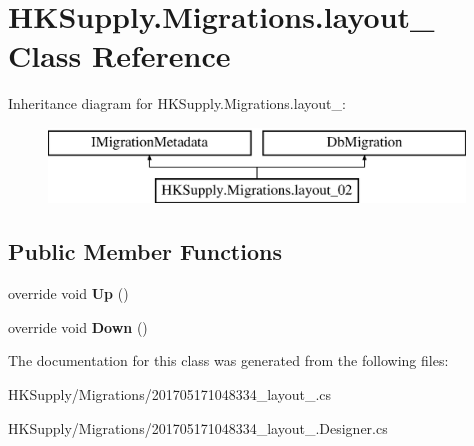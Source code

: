 \hypertarget{class_h_k_supply_1_1_migrations_1_1layout__02}{}\section{H\+K\+Supply.\+Migrations.\+layout\+\_ Class Reference}
\label{class_h_k_supply_1_1_migrations_1_1layout__02}
Inheritance diagram for H\+K\+Supply.\+Migrations.\+layout\+\_\+:\begin{figure}[H]
\begin{center}
\leavevmode
\includegraphics[height=2.000000cm]{class_h_k_supply_1_1_migrations_1_1layout__02}
\end{center}
\end{figure}
\subsection*{Public Member Functions}
\begin{DoxyCompactItemize}
\item 
\mbox{\label{class_h_k_supply_1_1_migrations_1_1layout__02_accb8fae63b4e422a6ebfacbe2803ad17}} 
override void {\bfseries Up} ()
\item 
\mbox{\label{class_h_k_supply_1_1_migrations_1_1layout__02_a813c7ef5aafacbc2a55a895b55b9f4bd}} 
override void {\bfseries Down} ()
\end{DoxyCompactItemize}


The documentation for this class was generated from the following files\+:\begin{DoxyCompactItemize}
\item 
H\+K\+Supply/\+Migrations/201705171048334\+\_\+layout\+\_.\+cs\item 
H\+K\+Supply/\+Migrations/201705171048334\+\_\+layout\+\_.\+Designer.\+cs\end{DoxyCompactItemize}

